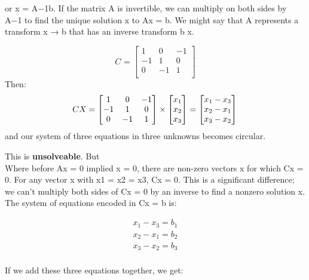 \documentclass{article}
\begin{document}
\\\\or x = A−1b. If the matrix A is invertible, we can multiply on both sides by
A−1 to find the unique solution x to Ax = b. We might say that A represents a
transform x → b that has an inverse transform b x.


\[
  C_{} = 
  \begin{bmatrix}
    1 & 0 & -1\\
    -1& 1 & 0\\
    0 & -1 & 1\\
  \end{bmatrix}
\]
Then:
\[
  CX_{} = 
  \begin{bmatrix}
    1 & 0 & -1\\
    -1& 1 & 0\\
    0 & -1 & 1\\
  \end{bmatrix}
  \times
  \begin{bmatrix}
   x_1\\
    x_2\\
    x_3\\ 
  \end{bmatrix}
  =
   \begin{bmatrix*}[r]
    x_1-x_3\\
    x_2-x_1\\
    x_3-x_2 \\ 
  \end{bmatrix*}
 \\
\]
and our system of three equations in three unknowns becomes circular. 

This is \textbf{unsolveable}. But
\pagebreak
\\
Where before Ax = 0 implied x = 0, there are non-zero vectors x for which
Cx = 0. For any vector x with x1 = x2 = x3, Cx = 0. This is a significant
difference; we can’t multiply both sides of Cx = 0 by an inverse to find a nonzero solution x.
The system of equations encoded in Cx = b is:
\begin{center}
\begin{align}
    x_1-x_3 = b_1\nonumber\\
    x_2-x_1 = b_2\nonumber\\
    x_3-x_2 = b_3\nonumber\\
    \nonumber
\end{align}
\end{center}

If we add these three equations together, we get: 
\end{document}
